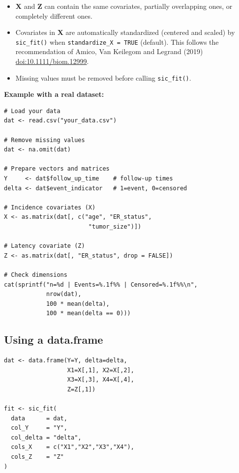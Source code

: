 \documentclass[12pt,a4paper]{article}
\begin{document}
\begin{infobox}[Important]
\begin{itemize}
  \item \textbf{X} and \textbf{Z} can contain the same
    covariates, partially overlapping ones, or completely
    different ones.
  \item Covariates in \textbf{X} are automatically
    standardized (centered and scaled) by
    \texttt{sic\_fit()} when \texttt{standardize\_X = TRUE}
    (default). This follows the recommendation of
    Amico, Van Keilegom and Legrand (2019)
    \href{https://doi.org/10.1111/biom.12999}
    {doi:10.1111/biom.12999}.
  \item Missing values must be removed before calling
    \texttt{sic\_fit()}.
\end{itemize}
\end{infobox}

\textbf{Example with a real dataset:}

\begin{lstlisting}[style=Rcode,
  caption={Preparing your own data}]
# Load your data
dat <- read.csv("your_data.csv")

# Remove missing values
dat <- na.omit(dat)

# Prepare vectors and matrices
Y     <- dat$follow_up_time    # follow-up times
delta <- dat$event_indicator   # 1=event, 0=censored

# Incidence covariates (X)
X <- as.matrix(dat[, c("age", "ER_status",
                        "tumor_size")])

# Latency covariate (Z)
Z <- as.matrix(dat[, "ER_status", drop = FALSE])

# Check dimensions
cat(sprintf("n=%d | Events=%.1f%% | Censored=%.1f%%\n",
            nrow(dat),
            100 * mean(delta),
            100 * mean(delta == 0)))
\end{lstlisting}

\subsection{Using a data.frame}

\begin{lstlisting}[style=Rcode,
  caption={data.frame interface}]
dat <- data.frame(Y=Y, delta=delta,
                  X1=X[,1], X2=X[,2],
                  X3=X[,3], X4=X[,4],
                  Z=Z[,1])

fit <- sic_fit(
  data      = dat,
  col_Y     = "Y",
  col_delta = "delta",
  cols_X    = c("X1","X2","X3","X4"),
  cols_Z    = "Z"
)
\end{lstlisting}
\end{document}
